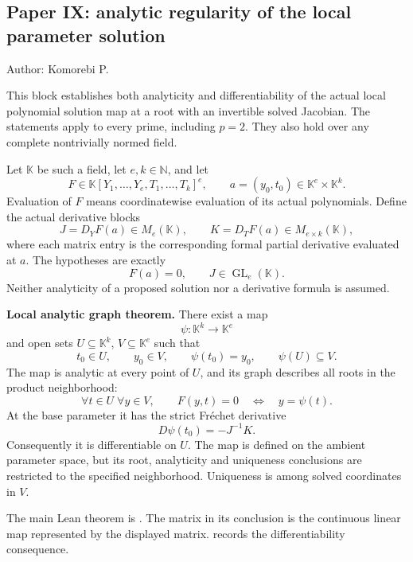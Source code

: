 \hypertarget{cont11:paper-ix-analytic-regularity-of-the-local-parameter-solution}{%
\subsection{Paper IX: analytic regularity of the local parameter
solution}\label{cont11:paper-ix-analytic-regularity-of-the-local-parameter-solution}}

Author: Komorebi P.

This block establishes both analyticity and differentiability of the
actual local polynomial solution map at a root with an invertible solved
Jacobian. The statements apply to every prime, including \(p=2\). They
also hold over any complete nontrivially normed field.

Let \(\mathbb K\) be such a field, let \(e,k\in\mathbb N\), and let \[
F\in\mathbb K[Y_1,\ldots,Y_e,T_1,\ldots,T_k]^e,
\qquad a=(y_0,t_0)\in\mathbb K^e\times\mathbb K^k.
\] Evaluation of \(F\) means coordinatewise evaluation of its actual
polynomials. Define the actual derivative blocks \[
J=D_YF(a)\in M_e(\mathbb K),
\qquad K=D_TF(a)\in M_{e\times k}(\mathbb K),
\] where each matrix entry is the corresponding formal partial
derivative evaluated at \(a\). The hypotheses are exactly \[
F(a)=0,
\qquad J\in\operatorname{GL}_e(\mathbb K).
\] Neither analyticity of a proposed solution nor a derivative formula
is assumed.

\textbf{Local analytic graph theorem.} There exist a map \[
\psi:\mathbb K^k\longrightarrow\mathbb K^e
\] and open sets \(U\subseteq\mathbb K^k\), \(V\subseteq\mathbb K^e\)
such that \[
t_0\in U,\qquad y_0\in V,\qquad \psi(t_0)=y_0,
\qquad \psi(U)\subseteq V.
\] The map is analytic at every point of \(U\), and its graph describes
all roots in the product neighborhood: \[
\forall t\in U\;\forall y\in V,
\qquad F(y,t)=0\quad\Longleftrightarrow\quad y=\psi(t).
\] At the base parameter it has the strict Fréchet derivative \[
\boxed{D\psi(t_0)=-J^{-1}K.}
\] Consequently it is differentiable on \(U\). The map is defined on the
ambient parameter space, but its root, analyticity and uniqueness
conclusions are restricted to the specified neighborhood. Uniqueness is
among solved coordinates in \(V\).

The main Lean theorem is
.
The matrix in its  conclusion is the
continuous linear map represented by the displayed matrix.
 records the
differentiability consequence.

